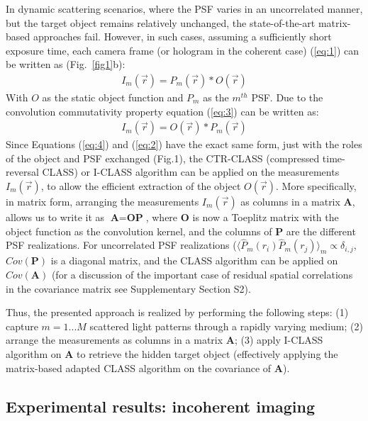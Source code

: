 \documentclass[pdflatex,sn-mathphys-num]{sn-jnl}%
\theoremstyle{thmstyleone}%
\theoremstyle{thmstyletwo}%
\theoremstyle{thmstylethree}%
\begin{document}
In dynamic scattering scenarios, where the PSF varies in an uncorrelated manner, but the target object remains relatively unchanged, the state-of-the-art matrix-based approaches fail. 
However, in such cases, assuming a sufficiently short exposure time, each camera frame (or hologram in the coherent case) (\ref{eq:1}) can be written as (Fig.~\ref{fig1}b):
\begin{eqnarray}
I_{m}(\vec{r}) = P_{m}(\vec{r}) \ast O (\vec{r})
\label{eq:3}
\end{eqnarray} 
With $O$ as the static object function and $P_{m}$ as the $m^{th}$ PSF.
Due to the convolution commutativity property equation (\ref{eq:3}) can be written as:
\begin{eqnarray}
I_{m}(\vec{r}) = O (\vec{r}) \ast P_{m}(\vec{r})
\label{eq:4}
\end{eqnarray} 
Since Equations (\ref{eq:4}) and (\ref{eq:2}) have the exact same form, just with the roles of the object and PSF exchanged (Fig.1), the CTR-CLASS \cite{lee22} (compressed time-reversal CLASS) or I-CLASS \cite{weinberg2023noninvasive} algorithm can be applied on the measurements $I_{m}(\vec{r})$, to allow the efficient extraction of the object $ O(\vec{r}) $. 
More specifically, in matrix form, arranging the measurements $I_{m}(\vec{r})$ as columns in a matrix $\textbf{A}$, allows us to write it as $\textbf{A} = \textbf{O}\textbf{P}$, where $\textbf{O}$ is now a Toeplitz matrix with the object function as the convolution kernel, and the columns of $\textbf{P}$ are the different PSF realizations. For uncorrelated PSF realizations ($\langle\hat{P}_m(r_i)\hat{P}_m(r_j)\rangle_m \propto \delta_{i,j}$, $Cov(\textbf{P})$ is a diagonal matrix, and the CLASS algorithm can be applied on $Cov(\textbf{A})$ (for a discussion of the important case of residual spatial correlations in the covariance matrix see Supplementary Section S2).

Thus, the presented approach is realized by performing the following steps: (1) capture $m=1...M$ scattered light patterns through a rapidly varying medium; (2) arrange the measurements as columns in a matrix $\textbf{A}$; (3) apply I-CLASS \cite{weinberg2023noninvasive} algorithm on $\textbf{A}$ to retrieve the hidden target object (effectively applying the matrix-based adapted CLASS algorithm on the covariance of $\textbf{A}$). 


\subsection*{Experimental results: incoherent imaging}
\end{document}
